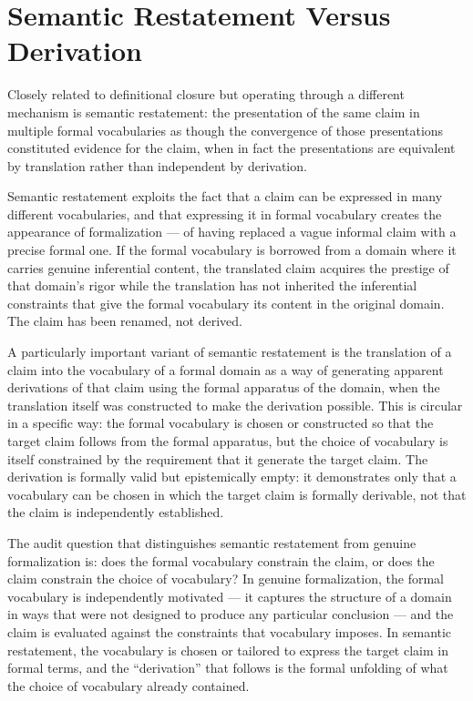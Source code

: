 \documentclass[12pt, openright, twoside]{book}
\begin{document}
\section{Semantic Restatement Versus Derivation}

Closely related to definitional closure but operating through
a different mechanism is semantic restatement: the presentation
of the same claim in multiple formal vocabularies as though
the convergence of those presentations constituted evidence
for the claim, when in fact the presentations are equivalent
by translation rather than independent by derivation.

Semantic restatement exploits the fact that a claim can be
expressed in many different vocabularies, and that expressing
it in formal vocabulary creates the appearance of formalization
--- of having replaced a vague informal claim with a precise
formal one. If the formal vocabulary is borrowed from a domain
where it carries genuine inferential content, the translated
claim acquires the prestige of that domain's rigor while the
translation has not inherited the inferential constraints that
give the formal vocabulary its content in the original domain.
The claim has been renamed, not derived.

A particularly important variant of semantic restatement is
the translation of a claim into the vocabulary of a formal
domain as a way of generating apparent derivations of that
claim using the formal apparatus of the domain, when the
translation itself was constructed to make the derivation
possible. This is circular in a specific way: the formal
vocabulary is chosen or constructed so that the target claim
follows from the formal apparatus, but the choice of vocabulary
is itself constrained by the requirement that it generate
the target claim. The derivation is formally valid but
epistemically empty: it demonstrates only that a vocabulary
can be chosen in which the target claim is formally derivable,
not that the claim is independently established.

The audit question that distinguishes semantic restatement
from genuine formalization is: does the formal vocabulary
constrain the claim, or does the claim constrain the choice
of vocabulary? In genuine formalization, the formal vocabulary
is independently motivated --- it captures the structure of
a domain in ways that were not designed to produce any
particular conclusion --- and the claim is evaluated against
the constraints that vocabulary imposes. In semantic
restatement, the vocabulary is chosen or tailored to express
the target claim in formal terms, and the ``derivation'' that
follows is the formal unfolding of what the choice of
vocabulary already contained.
\end{document}
